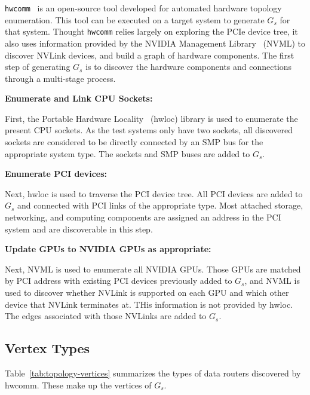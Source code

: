 \texttt{hwcomm}~\cite{pearson2018hwcomm} is an open-source tool developed for automated hardware topology enumeration.
This tool can be executed on a target system to generate $G_s$ for that system.
Thought \texttt{hwcomm} relies largely on exploring the PCIe device tree, it also uses information provided by the NVIDIA Management Library~\cite{nvidia2017nvml} (NVML) to discover NVLink devices, and build a graph of hardware components.
The first step of generating $G_s$ is to discover the hardware components and connections through a multi-stage process.

\textbf{Enumerate and Link CPU Sockets:}

First, the Portable Hardware Locality~\cite{broquedis2010hwloc} (hwloc) library is used to enumerate the present CPU sockets.
As the test systems only have two sockets, all discovered sockets are considered to be directly connected by an SMP bus for the appropriate system type.
The sockets and SMP buses are added to $G_s$.

\textbf{Enumerate PCI devices:}

Next, hwloc is used to traverse the PCI device tree.
All PCI devices are added to $G_s$ and connected with PCI links of the appropriate type.
Most attached storage, networking, and computing components are assigned an address in the PCI system and are discoverable in this step.

\textbf{Update GPUs to NVIDIA GPUs as appropriate:}

Next, NVML is used to enumerate all NVIDIA GPUs.
Those GPUs are matched by PCI address with existing PCI devices previously added to $G_s$, and NVML is used to discover whether NVLink is supported on each GPU and which other device that NVLink terminates at.
THis information is not provided by hwloc.
The edges associated with those NVLinks are added to $G_s$.


\subsection{Vertex Types}
\label{sec:system-vertices}

Table~\ref{tab:topology-vertices} summarizes the types of data routers discovered by hwcomm.
These make up the vertices of $G_s$.

